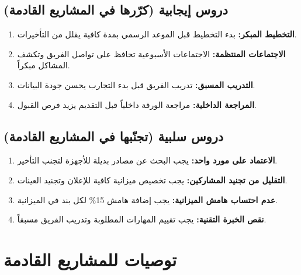 \documentclass[11pt,a4paper]{article}
\begin{document}
\subsection{دروس إيجابية (كرّرها في المشاريع القادمة)}
\begin{enumerate}
    \item \textbf{التخطيط المبكر:} بدء التخطيط قبل الموعد الرسمي بمدة كافية يقلل من التأخيرات.
    \item \textbf{الاجتماعات المنتظمة:} الاجتماعات الأسبوعية تحافظ على تواصل الفريق وتكشف المشاكل مبكراً.
    \item \textbf{التدريب المسبق:} تدريب الفريق قبل بدء التجارب يحسن جودة البيانات.
    \item \textbf{المراجعة الداخلية:} مراجعة الورقة داخلياً قبل التقديم يزيد فرص القبول.
\end{enumerate}

\subsection{دروس سلبية (تجنّبها في المشاريع القادمة)}
\begin{enumerate}
    \item \textbf{الاعتماد على مورد واحد:} يجب البحث عن مصادر بديلة للأجهزة لتجنب التأخير.
    \item \textbf{التقليل من تجنيد المشاركين:} يجب تخصيص ميزانية كافية للإعلان وتجنيد العينات.
    \item \textbf{عدم احتساب هامش الميزانية:} يجب إضافة هامش 15\% لكل بند في الميزانية.
    \item \textbf{نقص الخبرة التقنية:} يجب تقييم المهارات المطلوبة وتدريب الفريق مسبقاً.
\end{enumerate}

\section{توصيات للمشاريع القادمة}
\label{sec:recommendations}
\end{document}
